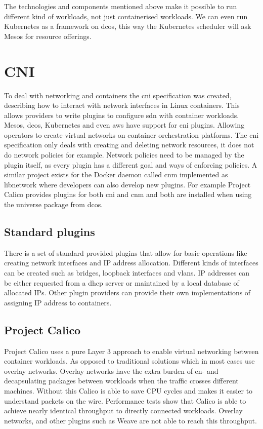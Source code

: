 The technologies and components mentioned above make it possible to run different kind of workloads, not just containerised workloads. We can even run Kubernetes as a framework on \gls{dcos}, this way the Kubernetes scheduler will ask Mesos for resource offerings.

\section{CNI}
\label{sec:cni}
To deal with networking and containers the \gls{cni} specification was created, describing how to interact with network interfaces in Linux containers. This allows providers to write plugins to configure \gls{sdn} with container workloads. Mesos, \gls{dcos}, Kubernetes and even \gls{aws} have support for \gls{cni} plugins. Allowing operators to create virtual networks on container orchestration platforms.
The \gls{cni} specification only deals with creating and deleting network resources, it does not do network policies for example. Network policies need to be managed by the plugin itself, as every plugin has a different goal and ways of enforcing policies. A similar project exists for the Docker daemon called \gls{cnm}\cite{cnm, dua2016learning} implemented as libnetwork where developers can also develop new plugins. For example Project Calico provides plugins for both \gls{cni} and \gls{cnm} and both are installed when using the universe package from \gls{dcos}.

\subsection{Standard plugins}
\label{subsec:plugins}
There is a set of standard provided plugins\cite{cni_plugin} that allow for basic operations like creating network interfaces and IP address allocation. Different kinds of interfaces can be created such as bridges, loopback interfaces and \glspl{vlan}. IP addresses can be either requested from a \gls{dhcp} server or maintained by a local database of allocated IPs. Other plugin providers can provide their own implementations of assigning IP address to containers.

\subsection{Project Calico}
\label{subsec:calico}
Project Calico uses a pure Layer 3 approach to enable virtual networking between container workloads. As opposed to traditional solutions which in most cases use overlay networks. Overlay networks have the extra burden of en- and decapsulating packages between workloads when the traffic crosses different machines. Without this Calico is able to save CPU cycles and makes it easier to understand packets on the wire. Performance tests\cite{dzone, dataplane, chunqi} show that Calico is able to achieve nearly identical throughput to directly connected workloads. Overlay networks, and other plugins such as Weave\cite{weave} are not able to reach this throughput.

